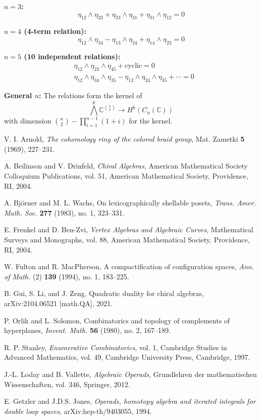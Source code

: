 \textbf{$n = 3$:}
\[
\eta_{12} \wedge \eta_{23} + \eta_{23} \wedge \eta_{31} + \eta_{31} \wedge \eta_{12} = 0
\]
 
\textbf{$n = 4$ (4-term relation):}
\[
\eta_{12} \wedge \eta_{34} - \eta_{13} \wedge \eta_{24} + \eta_{14} \wedge \eta_{23} = 0
\]
 
\textbf{$n = 5$ (10 independent relations):}
\begin{align}
&\eta_{12} \wedge \eta_{23} \wedge \eta_{45} + \text{cyclic} = 0 \\
&\eta_{12} \wedge \eta_{34} \wedge \eta_{35} - \eta_{13} \wedge \eta_{24} \wedge \eta_{35} + \cdots = 0
\end{align}
 
\textbf{General $n$:} The relations form the kernel of
\[
\bigwedge^k \mathbb{C}^{\binom{n}{2}} \to H^k(C_n(\mathbb{C}))
\]
with dimension $\binom{n}{2} - \prod_{i=1}^{n-1}(1 + i)$ for the kernel. 


\begin{thebibliography}{99}

V. I. Arnold, \emph{The cohomology ring of the colored braid group}, 
Mat. Zametki \textbf{5} (1969), 227--231.

 A. Beilinson and V. Drinfeld, \emph{Chiral Algebras}, American Mathematical Society Colloquium Publications, vol. 51, American Mathematical Society, Providence, RI, 2004.
 
 A. Björner and M. L. Wachs, On lexicographically shellable posets, \emph{Trans. Amer. Math. Soc.} \textbf{277} (1983), no. 1, 323--331.
 
 E. Frenkel and D. Ben-Zvi, \emph{Vertex Algebras and Algebraic Curves}, Mathematical Surveys and Monographs, vol. 88, American Mathematical Society, Providence, RI, 2004.
 
 W. Fulton and R. MacPherson, A compactification of configuration spaces, \emph{Ann. of Math.} (2) \textbf{139} (1994), no. 1, 183--225.
 
 B. Gui, S. Li, and J. Zeng, Quadratic duality for chiral algebras, arXiv:2104.06521 [math.QA], 2021.
 
 P. Orlik and L. Solomon, Combinatorics and topology of complements of hyperplanes, \emph{Invent. Math.} \textbf{56} (1980), no. 2, 167--189.
 
 R. P. Stanley, \emph{Enumerative Combinatorics}, vol. 1, Cambridge Studies in Advanced Mathematics, vol. 49, Cambridge University Press, Cambridge, 1997.

 J.-L. Loday and B. Vallette, \emph{Algebraic Operads}, Grundlehren der mathematischen Wissenschaften, vol. 346, Springer, 2012.

 E. Getzler and J.D.S. Jones, \emph{Operads, homotopy algebra and iterated integrals for double loop spaces}, arXiv:hep-th/9403055, 1994.
 
\end{thebibliography}
